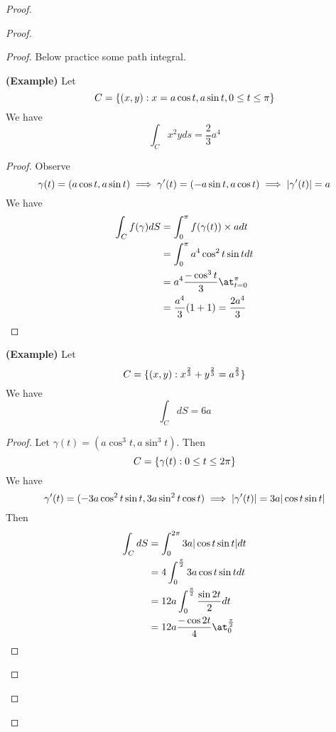 \documentclass{report}
\begin{document}
\begin{proof}
\begin{proof}
\begin{proof}
{\begin{minipage}{39em}
Below practice some path integral.
\end{minipage}}
\begin{theorem}
\label{7.1.4}
\textbf{(Example)} Let
\begin{equation}
C=\{ (x,y):x=a\cos t,a\sin t, 0\leq t\leq \pi \}
\end{equation}
We have
\begin{equation}
\int_C x^2y ds=\frac{2}{3}a^4
\end{equation}
\end{theorem}
\begin{proof}
Observe
\begin{equation}
\gamma (t)=(a\cos t,a\sin t)\implies \gamma '(t)=(-a\sin t,a\cos t)\implies |\gamma '(t)|=a
\end{equation}
We have
\begin{align}
\int_C f(\gamma ) dS&=\int_0^{\pi} f(\gamma (t))\times adt\\
&=\int_0^{\pi} a^4 \cos^2t \sin tdt\\
&=a^4 \frac{-\cos^3 t}{3}\at_{t=0}^\pi\\
&=\frac{a^4}{3}(1+1)=\frac{2a^4}{3}
\end{align}
\end{proof}
\begin{theorem}
\label{7.1.5}
\textbf{(Example)} Let
\begin{equation}
  C=\{ (x,y):x^{\frac{2}{3}}+y^{\frac{2}{3}}=a ^{\frac{2}{3}} \}
\end{equation}
We have
\begin{equation}
\int_C dS= 6a
\end{equation}
\end{theorem}
\begin{proof}
Let $\gamma (t)=(a\cos^3 t,a\sin^3 t)$. Then 
\begin{equation}
C=\{ \gamma  (t):0\leq t\leq  2\pi  \}
\end{equation}
We have
\begin{equation}
\gamma '(t)=(-3a\cos ^2t \sin t,3a\sin^2 t\cos t)\implies |\gamma '(t)|=3a|\cos t\sin t|
\end{equation}
Then
\begin{align}
\int_C dS&= \int_0^{2\pi} 3a\abso{\cos t\sin t}dt\\
&=4\int_0^{\frac{\pi}{2}}3a \cos t \sin tdt\\
&=12a\int_0^{\frac{\pi}{2}}\frac{\sin 2t}{2}dt\\
&=12a \frac{-\cos 2t}{4}\at_{0}^{\frac{\pi}{2}}\\

\end{align}
\end{proof}
\end{proof}
\end{proof}
\end{proof}
\end{document}
